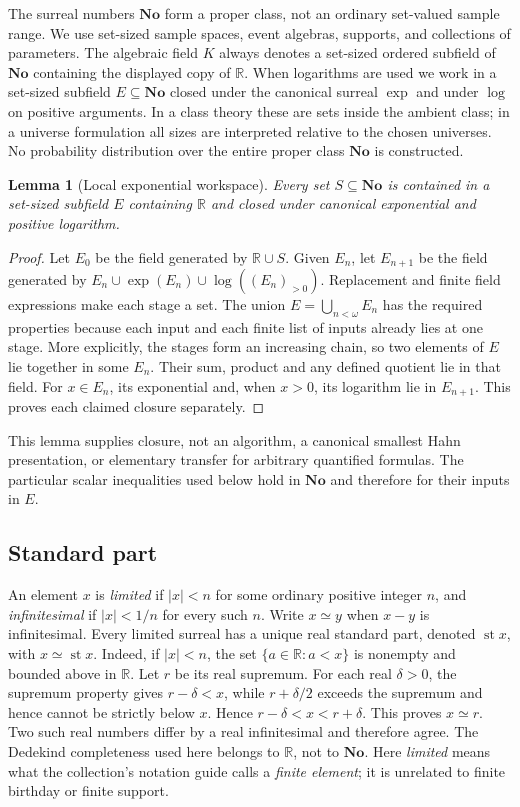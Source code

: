 \documentclass[11pt,a4paper]{article}
\numberwithin{equation}{section}
\newtheorem{lemma}[theorem]{Lemma}
\theoremstyle{definition}
\theoremstyle{remark}
\newcommand{\R}{\mathbb R}
\newcommand{\No}{\mathbf{No}}
\newcommand{\st}{\operatorname{st}}
\begin{document}
The surreal numbers $\No$ form a proper class, not an ordinary set-valued
sample range. We use set-sized sample spaces, event algebras, supports, and
collections of parameters. The algebraic field $K$ always denotes a
set-sized ordered subfield of $\No$ containing the displayed copy of $\R$.
When logarithms are used we work in a set-sized subfield $E\subseteq\No$
closed under the canonical surreal $\exp$ and under $\log$ on positive
arguments. In a class theory these are sets inside the ambient class; in a
universe formulation all sizes are interpreted relative to the chosen
universes. No probability distribution over the entire proper class $\No$
is constructed.

\begin{lemma}[Local exponential workspace]\label{fsp:lem:workspace}
Every set $S\subseteq\No$ is contained in a set-sized subfield $E$ containing
$\R$ and closed under canonical exponential and positive logarithm.
\end{lemma}
\begin{proof}
Let $E_0$ be the field generated by $\R\cup S$. Given $E_n$, let $E_{n+1}$
be the field generated by
$E_n\cup\exp(E_n)\cup\log((E_n)_{>0})$.
Replacement and finite field expressions make each stage a set.
The union $E=\bigcup_{n<\omega}E_n$ has the required properties because each
input and each finite list of inputs already lies at one stage.
More explicitly, the stages form an increasing chain, so two elements of
$E$ lie together in some $E_n$. Their sum, product and any defined quotient
lie in that field. For $x\in E_n$, its exponential and, when $x>0$, its
logarithm lie in $E_{n+1}$. This proves each claimed closure separately.
\end{proof}

This lemma supplies closure, not an algorithm, a canonical smallest Hahn
presentation, or elementary transfer for arbitrary quantified formulas.
The particular scalar inequalities used below hold in $\No$ and therefore
for their inputs in $E$.

\subsection{Standard part}

An element $x$ is \emph{limited} if $|x|<n$ for some ordinary positive
integer $n$, and \emph{infinitesimal} if $|x|<1/n$ for every such $n$.
Write $x\simeq y$ when $x-y$ is infinitesimal. Every limited surreal has a
unique real standard part, denoted $\st x$, with $x\simeq\st x$.
Indeed, if $|x|<n$, the set $\{a\in\R:a<x\}$ is nonempty and
bounded above in $\R$. Let $r$ be its real supremum. For each real
$\delta>0$, the supremum property gives $r-\delta<x$, while
$r+\delta/2$ exceeds the supremum and hence cannot be strictly below $x$.
Hence $r-\delta<x<r+\delta$. This proves $x\simeq r$.
Two such real numbers differ by a real infinitesimal and therefore agree.
The Dedekind completeness used here belongs to $\R$, not to $\No$.
Here \emph{limited} means what the collection's notation guide calls a
\emph{finite element}; it is unrelated to finite birthday or finite support.
\end{document}

